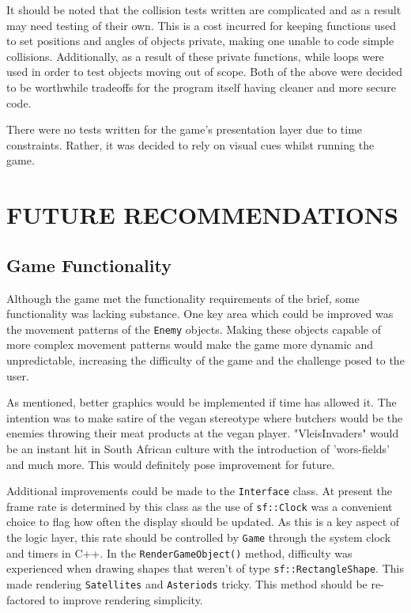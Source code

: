\documentclass[10pt,twocolumn]{witseiepaper}
\begin{document}
It should be noted that the collision tests written are complicated and as a result may need testing of their own. This is a cost incurred for keeping functions used to set positions and angles of objects private, making one unable to code simple collisions. Additionally, as a result of these private functions, while loops were used in order to test objects moving out of scope. Both of the above were decided to be worthwhile tradeoffs for the program itself having cleaner and more secure code.

There were no tests written for the game's presentation layer due to time constraints. Rather, it was decided to rely on visual cues whilst running the game. 

\section{FUTURE RECOMMENDATIONS}

\subsection{Game Functionality}

Although the game met the functionality requirements of the brief, some functionality was lacking substance. One key area which could be improved was the movement patterns of the \texttt{Enemy} objects. Making these objects capable of more complex movement patterns would make the game more dynamic and unpredictable, increasing the difficulty of the game and the challenge posed to the user.

As mentioned, better graphics would be implemented if time has allowed it. The intention was to make satire of the vegan stereotype where butchers would be the enemies throwing their meat products at the vegan player. "VleisInvaders" would be an instant hit in South African culture with the introduction of 'wors-fields' and much more. This would definitely pose improvement for future.

Additional improvements could be made to the \texttt{Interface} class. At present the frame rate is determined by this class as the use of \texttt{sf::Clock} was a convenient choice to flag how often the display should be updated. As this is a key aspect of the logic layer, this rate should be controlled by \texttt{Game} through the system clock and timers in C++. In the \texttt{RenderGameObject()} method, difficulty was experienced when drawing shapes that weren't of type \texttt{sf::RectangleShape}. This made rendering \texttt{Satellites} and \texttt{Asteriods} tricky. This method should be re-factored to improve rendering simplicity.
\end{document}
